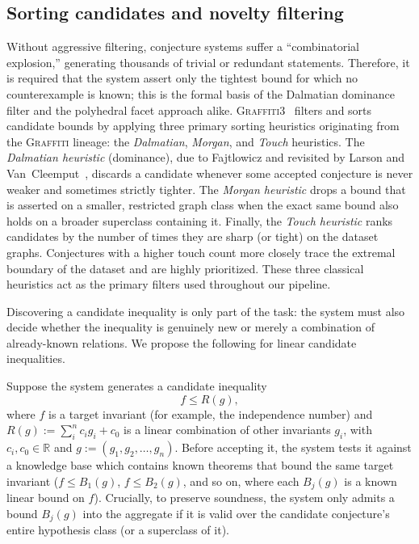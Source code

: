 \documentclass[]{ceurart}
\begin{document}
\subsection{Sorting candidates and novelty filtering}
\label{sec:heuristics_related}
Without aggressive filtering, conjecture systems suffer a ``combinatorial
explosion,'' generating thousands of trivial or redundant statements. 
Therefore, it is required that the system assert only the
tightest bound for which no counterexample is known; this is the formal basis of
the Dalmatian dominance filter and the polyhedral facet approach alike.
\textsc{Graffiti3}~\cite{davila2026graffiti3} filters and sorts candidate bounds by applying three primary sorting heuristics originating from the \textsc{Graffiti} lineage: the \emph{Dalmatian}, \emph{Morgan}, and \emph{Touch} heuristics. The \emph{Dalmatian heuristic} (dominance), due to Fajtlowicz and revisited by Larson and Van~Cleemput~\cite{fajtlowicz1988conjectures,larson2016dalmatian}, discards a candidate whenever some accepted conjecture is never weaker and sometimes strictly tighter. The \emph{Morgan heuristic} drops a bound that is asserted on a smaller, restricted graph class when the exact same bound also holds on a broader superclass containing it. Finally, the \emph{Touch heuristic} ranks candidates by the number of times they are sharp (or tight) on the dataset graphs. Conjectures with a higher touch count more closely trace the extremal boundary of the dataset and are highly prioritized. These three classical heuristics act as the primary filters used throughout our pipeline.

Discovering a candidate inequality is only part of the task: the system must also
decide whether the inequality is genuinely new or merely a combination of
already-known relations. We propose the following for linear candidate inequalities.

Suppose the system generates a candidate inequality
    \[
        f \le R(g),
    \]
    where $f$ is a target invariant (for example, the independence number) and $R(g) := \sum_i^n c_i g_i + c_0$ is a linear combination of other invariants $g_i$, with $c_i, c_0 \in \mathbb{R}$ and $g := (g_1, g_2, \ldots, g_n)$. Before accepting it, the system tests it against a knowledge base which contains known theorems that bound the
  same target invariant ($f \le B_1(g)$, $f \le B_2(g)$, and so on, where each $B_j(g)$ is a known linear bound on $f$). Crucially, to preserve soundness, the system only admits a bound $B_j(g)$ into the aggregate if it is valid over
  the candidate conjecture's entire hypothesis class (or a superclass of it).
    
\end{document}
